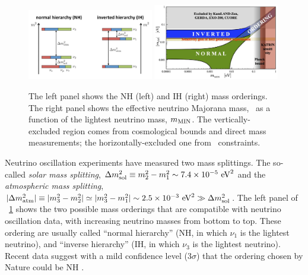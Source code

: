 \begin{figure}[h!]
\centering
\includegraphics[width=0.49\textwidth]{img2/mass-hierarchy-jgu-mainz-web.jpg} \hfill
\includegraphics[width=0.49\textwidth]{img2/APPECbetabetameff.jpg}
\caption{\small The left panel shows the NH (left) and IH (right) mass orderings. 
The right panel \cite{Giuliani:2019uno} shows the effective neutrino Majorana mass, \mbb\, as a function of the lightest neutrino mass, $m_{\rm MIN}$.
The vertically-excluded region comes from cosmological bounds and direct mass measurements; the horizontally-excluded one from \bbonu\ constraints.} \label{fig:numass_ordering}
\end{figure}


Neutrino oscillation experiments have measured two mass splittings. The so-called \emph{solar mass splitting}, $\Delta m^2_{ \rm sol}\equiv m^2_2-m^2_1\sim 7.4 \times
10^{-5}\ {\rm eV}^2$ and the
\emph{atmospheric mass splitting}, $|\Delta m^2_{\rm
atm}|\equiv |m^2_3-m^2_2|\simeq|m^2_3-m^2_1| \sim 2.5 \times 10^{-3}\ {\rm
eV}^2\gg \Delta m^2_{\rm sol}$. The left panel of \fig~\ref{fig:numass_ordering} shows the two possible mass orderings that are compatible with neutrino oscillation data, with increasing neutrino masses from bottom to top. These ordering are usually called ``normal hierarchy'' (NH, in which $\nu_1$ is the lightest neutrino), and
``inverse hierarchy'' (IH, in which $\nu_3$ is the lightest neutrino). Recent data suggest with a mild confidence level (3$\sigma$) that the ordering chosen by Nature could be NH \cite{deSalas:2018bym}.

